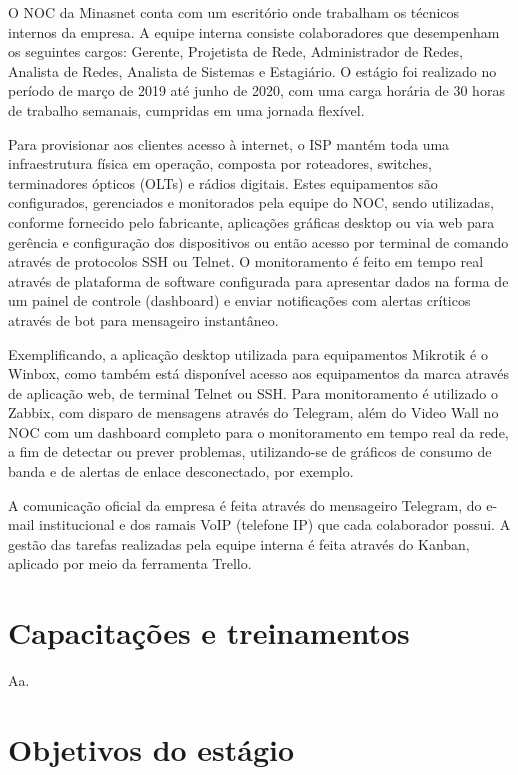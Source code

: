     O NOC da Minasnet conta com um escritório onde trabalham os técnicos internos da empresa. A equipe interna consiste colaboradores que desempenham os seguintes cargos: Gerente, Projetista de Rede, Administrador de Redes, Analista de Redes, Analista de Sistemas e Estagiário. O estágio foi realizado no período de março de 2019 até junho de 2020, com uma carga horária de 30 horas de trabalho semanais, cumpridas em uma jornada flexível.

    Para provisionar aos clientes acesso à internet, o ISP mantém toda uma infraestrutura física em operação, composta por roteadores, switches, terminadores ópticos (OLTs) e rádios digitais. Estes equipamentos são configurados, gerenciados e monitorados pela equipe do NOC, sendo utilizadas, conforme fornecido pelo fabricante, aplicações gráficas desktop ou via web para gerência e configuração dos dispositivos ou então acesso por terminal de comando através de protocolos SSH ou Telnet. O monitoramento é feito em tempo real através de plataforma de software configurada para apresentar dados na forma de um painel de controle (dashboard) e enviar notificações com alertas críticos através de bot para mensageiro instantâneo.
    
    Exemplificando, a aplicação desktop utilizada para equipamentos Mikrotik é o Winbox, como também está disponível acesso aos equipamentos da marca através de aplicação web, de terminal Telnet ou SSH. Para monitoramento é utilizado o Zabbix, com disparo de mensagens através do Telegram, além do Video Wall no NOC com um dashboard completo para o monitoramento em tempo real da rede, a fim de detectar ou prever problemas, utilizando-se de gráficos de consumo de banda e de alertas de enlace desconectado, por exemplo.

    A comunicação oficial da empresa é feita através do mensageiro Telegram, do e-mail institucional e dos ramais VoIP (telefone IP) que cada colaborador possui. A gestão das tarefas realizadas pela equipe interna é feita através do Kanban, aplicado por meio da ferramenta Trello.

\section{Capacitações e treinamentos}

    Aa.

\section{Objetivos do estágio}


